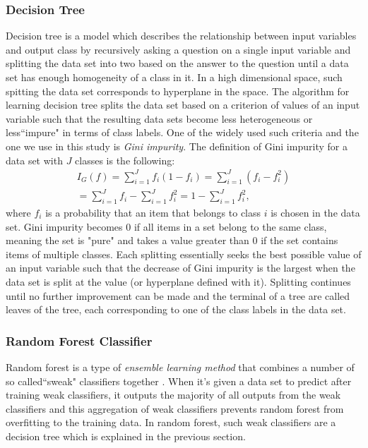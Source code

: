 		\subsubsection*{Decision Tree}
		Decision tree is a model which describes the relationship between input variables and output class by recursively asking a question on a single input variable and splitting the data set into two based on the answer to the question until a data set has enough homogeneity of a class in it. In a high dimensional space, such spitting the data set corresponds to hyperplane in the space. The algorithm for learning decision tree splits the data set based on a criterion of values of an input variable such that the resulting data sets become less heterogeneous or less``impure" in terms of class labels. One of the widely used such criteria and the one we use in this study is \textit{Gini impurity}. The definition of Gini impurity for a data set with $J$ classes is the following:
	\begin{equation}
		\begin{split}
	I_G(f) = \sum_{i=1}^J f_i(1-f_i) = \sum_{i=1}^J (f_i-f_i^2) \\
	  = \sum_{i=1}^J f_i - \sum_{i=1}^J f_i^2 = 1- \sum_{i=1}^J f_i^2,
		\end{split}
	\end{equation}
where $f_i$ is a probability that an item that belongs to class $i$ is chosen in the data set. Gini impurity becomes $0$ if all items in a set belong to the same class, meaning the set is "pure" and takes a value greater than $0$ if the set contains items of multiple classes. Each splitting essentially seeks the best possible value of an input variable such that the decrease of Gini impurity is the largest when the data set is split at the value (or hyperplane defined with it). Splitting continues until no further improvement can be made and the terminal of a tree are called leaves of the tree, each corresponding to one of the class labels in the data set.
		
	
		\subsubsection*{Random Forest Classifier}
Random forest is a type of \textit{ensemble learning method} that combines a number of so called``sweak" classifiers together \cite{RandomForest}. When it's given a data set to predict after training weak classifiers, it outputs the majority of all outputs from the weak classifiers and this aggregation of weak classifiers prevents random forest from overfitting to the training data. In random forest, such weak classifiers are a decision tree which is explained in the previous section.

